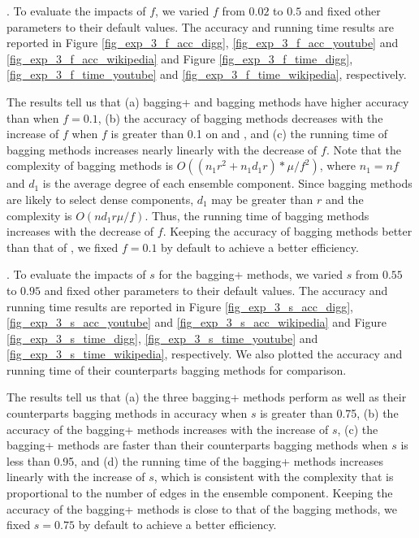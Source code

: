 . To evaluate the impacts of $f$, we
varied $f$ from $0.02$ to $0.5$ and fixed other parameters to their
default values. The accuracy and running time results are reported in
Figure \ref{fig_exp_3_f_acc_digg}, \ref{fig_exp_3_f_acc_youtube} and
\ref{fig_exp_3_f_acc_wikipedia} and Figure \ref{fig_exp_3_f_time_digg},
\ref{fig_exp_3_f_time_youtube} and \ref{fig_exp_3_f_time_wikipedia}, respectively.



The results tell us that (a) bagging+ and bagging methods have higher accuracy
than \NMF when $f = 0.1$, (b) the accuracy of bagging methods decreases
with the increase of $f$ when $f$ is greater than 0.1 on \Digg and \Wikipedia, 
and (c) the running time of bagging methods increases
nearly linearly with the decrease of $f$. Note that the complexity of bagging methods is
$O((n_{1}r^2 + n_{1}d_{1}r)*\mu /f^2)$, where $n_1 = nf$ and $d_1$ is the average degree of
each ensemble component. Since bagging methods are likely to select dense components, $d_1$
may be greater than $r$ and the complexity is $O(nd_1r\mu /f)$. Thus, the running time
of bagging methods increases with the decrease of $f$. Keeping the accuracy of bagging
methods better than that of \NMF, we fixed $f = 0.1$ by default to achieve a better efficiency.




. To evaluate the impacts of $s$ for
the bagging+ methods, we varied $s$ from $0.55$ to $0.95$ and
fixed other parameters to their default values. The accuracy and
running time results are reported in
Figure \ref{fig_exp_3_s_acc_digg}, \ref{fig_exp_3_s_acc_youtube} and
\ref{fig_exp_3_s_acc_wikipedia} and Figure \ref{fig_exp_3_s_time_digg},
\ref{fig_exp_3_s_time_youtube} and \ref{fig_exp_3_s_time_wikipedia}, respectively.
We also plotted the accuracy and running time of their counterparts
bagging methods for comparison.

The results tell us that (a) the three bagging+ methods perform
as well as their counterparts bagging methods in accuracy when
$s$ is greater than 0.75, (b) the accuracy of the bagging+ methods
increases with the increase of $s$, (c) the bagging+ methods are faster
than their counterparts bagging methods when $s$ is less than 0.95,
and (d) the running time of the bagging+ methods increases linearly
with the increase of $s$, which is consistent with
the complexity that is proportional to the number of edges in the
ensemble component. Keeping the accuracy of the bagging+ methods is close to
that of the bagging methods, we fixed $s = 0.75$ by default to achieve a better efficiency.



